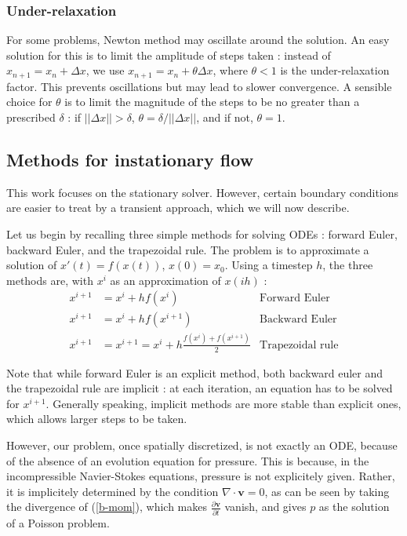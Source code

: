 \documentclass[12pt]{article}
\newcommand{\vb}[1]{\ensuremath{\boldsymbol #1}}
\begin{document}
\subsubsection{Under-relaxation}
For some problems, Newton method may oscillate around the solution. An
easy solution for this is to limit the amplitude of steps taken :
instead of $x_{n+1} = x_n + \Delta x$, we use $x_{n+1} = x_n +\theta
\Delta x$, where $\theta < 1$ is the under-relaxation factor. This
prevents oscillations but may lead to slower convergence. A sensible
choice for $\theta$ is to limit the magnitude of the steps to be no
greater than a prescribed $\delta$ : if $||\Delta x|| > \delta$,
$\theta = \delta / ||\Delta x||$, and if not, $\theta = 1$.

\subsection{Methods for instationary flow}
This work focuses on the stationary solver. However, certain boundary
conditions are easier to treat by a transient approach, which we will
now describe.

Let us begin by recalling three simple methods for solving ODEs :
forward Euler, backward Euler, and the trapezoidal rule. The problem
is to approximate a solution of $x'(t) = f(x(t))$, $x(0) =
x_0$. Using a timestep $h$, the three methods
are, with $x^i$ as an approximation of $x(i h)$ :
\begin{align}
  \label{fe}
  x^{i+1} &= x^i + h f(x^i) & \text{Forward Euler}\\
  \label{be}
  x^{i+1} &= x^i + h f(x^{i+1}) & \text{Backward Euler}\\
  \label{tr}
  x^{i+1} &= x^{i+1} = x^i + h \frac{f(x^i) + f(x^{i+1})}{2}&
  \text{Trapezoidal rule}
\end{align}

Note that while forward Euler is an explicit method, both backward
euler and the trapezoidal rule are implicit : at each iteration, an
equation has to be solved for $x^{i+1}$. Generally speaking, implicit
methods are more stable than explicit ones, which allows larger
steps to be taken.

However, our problem, once spatially discretized, is not exactly an
ODE, because of the absence of an evolution equation for
pressure. This is because, in the incompressible Navier-Stokes
equations, pressure is not explicitely given. Rather, it is
implicitely determined by the condition $\nabla \cdot \vb{v} = 0$, as
can be seen by taking the divergence of (\ref{b-mom}), which makes
$\frac{\partial \vb{v}}{\partial t}$ vanish, and gives $p$ as the
solution of a Poisson problem.
\end{document}
